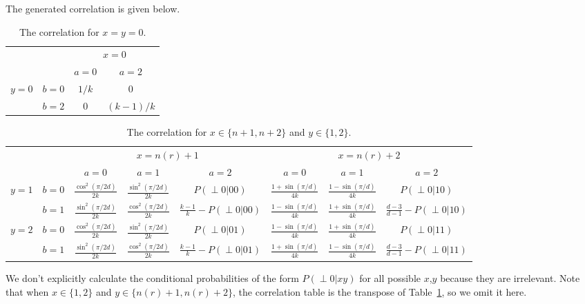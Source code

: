 \documentclass[11pt,letterpaper]{article}
\newcommand{\1}{\mathbb{1}}
\newcommand{\nr}{n(r)}
\newcommand{\pr}[2]{P(#1|#2)}
\theoremstyle{definition}
\begin{document}
The generated correlation is given below.
\begin{table}[H]
\begin{center}
\begin{tabular}{|c|c||c|c|}
\hline
\multicolumn{2}{|c|}{} &
\multicolumn{2}{|c|}{$x=0$}\\
\cline{3-4}
\multicolumn{2}{|c|}{} &$a = 0$ & $a = 2$ \\
\hline
\hline
\multirow{2}{*}{$y = 0$} & $b = 0$ & $1/k$ & $0$ \\
\cline{2-4}
&$b=2$ & $0$ & $(k-1)/k$ \\
\hline
\end{tabular}
\caption{The correlation for $x=y=0$.}
\end{center}
\end{table}

\begin{table}[H]
\begin{center}
\begin{tabular}{|c|c||c|c|c|c|c|c|}
\hline
\multicolumn{2}{|c|}{} &
\multicolumn{3}{|c|}{$x=\nr+1$}&
\multicolumn{3}{|c|}{$x=\nr+2$} \\
\cline{3-8}
\multicolumn{2}{|c|}{} &
$a = 0$ & $a=1$ & $a=2$ &
$a = 0$ & $a=1$ & $a=2$\\
\hline
\hline
\multirow{2}{*}{$y = 1$} & $b=0$ & $\frac{\cos^2(\pi/2d)}{2k}$ & $\frac{\sin^2(\pi/2d)}{2k}$ & \small $\pr{\perp0}{00}$ 
& $\frac{1+\sin(\pi/d)}{4k}$ & $\frac{1-\sin(\pi/d)}{4k}$ & \small  $\pr{\perp0}{10}$ \\
\cline{2-8}
&$b=1$ & $\frac{\sin^2(\pi/2d)}{2k}$ & $\frac{\cos^2(\pi/2d)}{2k}$ & $\frac{k-1}{k}-\pr{\perp0}{00}$ 
&  $\frac{1-\sin(\pi/d)}{4k}$ & $\frac{1+\sin(\pi/d)}{4k}$ & \small $\frac{d-3}{d-1} - \pr{\perp0}{10}$  \\
\hline
\multirow{2}{*}{$y = 2$} & $b=0$ & $\frac{\cos^2(\pi/2d)}{2k}$ & $\frac{\sin^2(\pi/2d)}{2k}$ & \small $\pr{\perp0}{01}$ & 
$ \frac{1-\sin(\pi/d)}{4k}$ & $ \frac{1+\sin(\pi/d)}{4k}$ & \small $\pr{\perp 0}{11}$  \\
\cline{2-8}
&$b=1$ & $\frac{\sin^2(\pi/2d)}{2k}$ & $\frac{\cos^2(\pi/2d)}{2k}$ & \small $\frac{k-1}{k}-\pr{\perp0}{01}$ &  
$ \frac{1+\sin(\pi/d)}{4k}$ & $ \frac{1-\sin(\pi/d)}{4k}$ & \small $\frac{d-3}{d-1}- \pr{\perp 0}{11}$ \\
\hline
\end{tabular}
\end{center}
\caption{The correlation for $x \in \{n+1, n+2\}$ and $y \in \{1,2\}$.}
\label{tb:chsh}
\end{table}
We don't explicitly calculate the conditional probabilities of the form $\pr{\perp 0}{xy}$ for all possible $x$,$y$ 
because they are irrelevant.
Note that when $x \in \{1,2\}$ and $y \in \{\nr+1, \nr+2\}$, the correlation table is 
the transpose of Table~\ref{tb:chsh}, so we omit it here.
\end{document}
